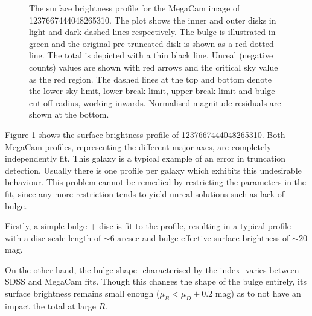 \begin{figure}
	\centering
	\label{fig: The mega profiles of 1237667444048265310}
	\caption{\footnotesize{The surface brightness profile for the MegaCam image of 1237667444048265310. The plot shows the inner and outer disks in light and dark dashed lines respectively. The bulge is illustrated in green and the original pre-truncated disk is shown as a red dotted line. The total is depicted with a thin black line.
		 Unreal (negative counts) values are shown with red arrows and the critical sky value as the red region. The dashed lines at the top and bottom denote the lower sky limit, lower break limit, upper break limit and bulge cut-off radius, working inwards. Normalised magnitude residuals are shown at the bottom.}}
\end{figure}
Figure \ref{fig: The mega profiles of 1237667444048265310} shows the surface brightness profile of 1237667444048265310. Both MegaCam profiles, representing the different major axes, are completely independently fit. This galaxy is a typical example of an error in truncation detection. Usually there is one profile per galaxy which exhibits this undesirable behaviour. This problem cannot be remedied by restricting the parameters in the fit, since any more restriction tends to yield unreal solutions such as lack of bulge.

Firstly, a simple bulge + disc is fit to the profile, resulting in a typical profile with a disc scale length of $\sim 6$ arcsec and bulge effective surface brightness of $\sim 20$ mag. 

On the other hand, the bulge shape -characterised by the \sersic index- varies between SDSS and MegaCam fits. Though this changes the shape of the bulge entirely, its surface brightness remains small enough ($\mu_B < \mu_D + 0.2$ mag) as to not have an impact the total at large $R$.

